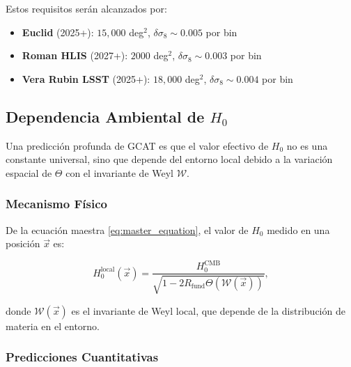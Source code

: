 \documentclass[12pt, a4paper]{article}
\theoremstyle{plain}
\theoremstyle{definition}
\begin{document}
Estos requisitos serán alcanzados por:
\begin{itemize}
    \item \textbf{Euclid} (2025+): $15,000$ deg$^2$, $\delta\sigma_8 \sim 0.005$ por bin
    \item \textbf{Roman HLIS} (2027+): $2000$ deg$^2$, $\delta\sigma_8 \sim 0.003$ por bin
    \item \textbf{Vera Rubin LSST} (2025+): $18,000$ deg$^2$, $\delta\sigma_8 \sim 0.004$ por bin
\end{itemize}

\subsection{Dependencia Ambiental de $H_0$}

Una predicción profunda de GCAT es que el valor efectivo de $H_0$ no es una constante universal, sino que depende del entorno local debido a la variación espacial de $\Theta$ con el invariante de Weyl $\mathcal{W}$.

\subsubsection{Mecanismo Físico}

De la ecuación maestra \eqref{eq:master_equation}, el valor de $H_0$ medido en una posición $\vec{x}$ es:

\begin{equation}
H_0^{\mathrm{local}}(\vec{x}) = \frac{H_0^{\mathrm{CMB}}}{\sqrt{1 - 2R_{\mathrm{fund}} \Theta(\mathcal{W}(\vec{x}))}},
\label{eq:H0_environmental}
\end{equation}

donde $\mathcal{W}(\vec{x})$ es el invariante de Weyl local, que depende de la distribución de materia en el entorno.

\subsubsection{Predicciones Cuantitativas}
\end{document}
